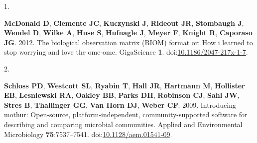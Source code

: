 \documentclass[
  11pt,
]{article}
\newlength{\cslhangindent}
\newlength{\csllabelwidth}
\newenvironment{CSLReferences}[2] %
 {\begin{list}{}{%
  \setlength{\itemindent}{0pt}
  \setlength{\leftmargin}{0pt}
  \setlength{\parsep}{0pt}
  \ifodd #1
   \setlength{\leftmargin}{\cslhangindent}
   \setlength{\itemindent}{-1\cslhangindent}
  \fi
  \setlength{\itemsep}{#2\baselineskip}}}
 {\end{list}}
\newcommand{\CSLLeftMargin}[1]{\parbox[t]{\csllabelwidth}{\strut#1\strut}}
\newcommand{\CSLRightInline}[1]{\parbox[t]{\linewidth - \csllabelwidth}{\strut#1\strut}}
\begin{document}
\label{refs}
\begin{CSLReferences}{0}{1}
\CSLLeftMargin{1. }%
\CSLRightInline{\textbf{McDonald D}, \textbf{Clemente JC},
\textbf{Kuczynski J}, \textbf{Rideout JR}, \textbf{Stombaugh J},
\textbf{Wendel D}, \textbf{Wilke A}, \textbf{Huse S}, \textbf{Hufnagle
J}, \textbf{Meyer F}, \textbf{Knight R}, \textbf{Caporaso JG}. 2012. The
biological observation matrix (BIOM) format or: How i learned to stop
worrying and love the ome-ome. GigaScience \textbf{1}.
doi:\href{https://doi.org/10.1186/2047-217x-1-7}{10.1186/2047-217x-1-7}.}

\CSLLeftMargin{2. }%
\CSLRightInline{\textbf{Schloss PD}, \textbf{Westcott SL},
\textbf{Ryabin T}, \textbf{Hall JR}, \textbf{Hartmann M},
\textbf{Hollister EB}, \textbf{Lesniewski RA}, \textbf{Oakley BB},
\textbf{Parks DH}, \textbf{Robinson CJ}, \textbf{Sahl JW}, \textbf{Stres
B}, \textbf{Thallinger GG}, \textbf{Van Horn DJ}, \textbf{Weber CF}.
2009. Introducing mothur: Open-source, platform-independent,
community-supported software for describing and comparing microbial
communities. Applied and Environmental Microbiology
\textbf{75}:7537--7541.
doi:\href{https://doi.org/10.1128/aem.01541-09}{10.1128/aem.01541-09}.}


\end{CSLReferences}
\end{document}
